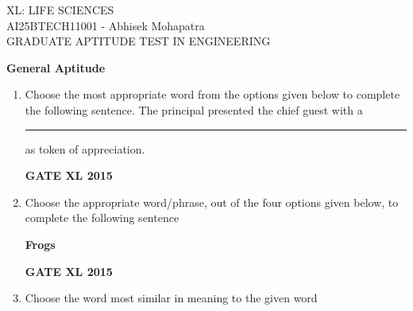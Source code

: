 \documentclass[journal,12pt,onecolumn]{IEEEtran}
\begin{document}
\begin{center}
    \huge{XL: LIFE SCIENCES}\\
    \large{AI25BTECH11001 - Abhisek Mohapatra}\\
    \large{GRADUATE APTITUDE TEST IN ENGINEERING}
\end{center}
\textbf{General Aptitude}
\begin{enumerate}

\item Choose the most appropriate word from the options given below to complete the following sentence. 
	The principal presented the chief guest with a \rule{1cm}{0.15mm} as token of appreciation.
    \begin{enumerate}
    \end{enumerate}

\hfill{\textbf{GATE XL 2015}}

\item Choose the appropriate word/phrase, out of the four options given below, to complete the following sentence

	\textbf{Frogs}
    \begin{enumerate}
    \end{enumerate}

\hfill{\textbf{GATE XL 2015}}
\item Choose the word most similar in meaning to the given word


\end{enumerate}
\end{document}
